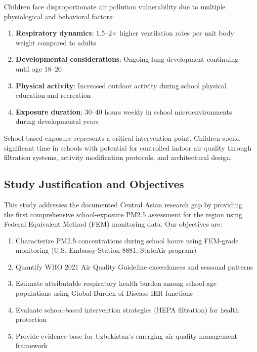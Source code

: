 \documentclass[11pt,a4paper]{article}
\begin{document}
Children face disproportionate air pollution vulnerability due to multiple physiological and behavioral factors:

\begin{enumerate}
    \item \textbf{Respiratory dynamics}: 1.5--2$\times$ higher ventilation rates per unit body weight compared to adults
    \item \textbf{Developmental considerations}: Ongoing lung development continuing until age 18--20
    \item \textbf{Physical activity}: Increased outdoor activity during school physical education and recreation
    \item \textbf{Exposure duration}: 30--40 hours weekly in school microenvironments during developmental years
\end{enumerate}

School-based exposure represents a critical intervention point. Children spend significant time in schools with potential for controlled indoor air quality through filtration systems, activity modification protocols, and architectural design.

\subsection{Study Justification and Objectives}

This study addresses the documented Central Asian research gap by providing the first comprehensive school-exposure PM2.5 assessment for the region using Federal Equivalent Method (FEM) monitoring data. Our objectives are:

\begin{enumerate}
    \item Characterize PM2.5 concentrations during school hours using FEM-grade monitoring (U.S. Embassy Station 8881, StateAir program)
    \item Quantify WHO 2021 Air Quality Guideline exceedances and seasonal patterns
    \item Estimate attributable respiratory health burden among school-age populations using Global Burden of Disease IER functions
    \item Evaluate school-based intervention strategies (HEPA filtration) for health protection
    \item Provide evidence base for Uzbekistan's emerging air quality management framework
\end{enumerate}
\end{document}
